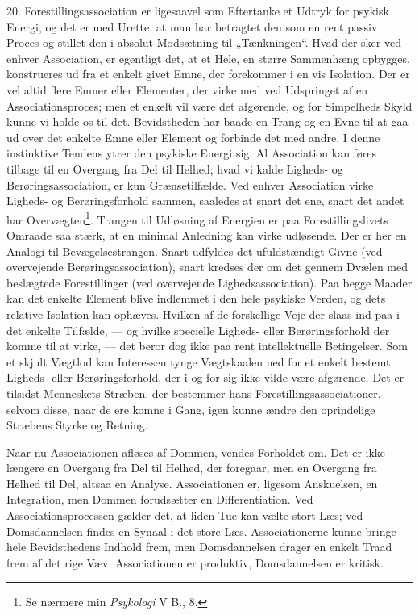 \documentclass[12pt,a4paper]{book}
\newcommand{\opage}[1]{\marginnote{\footnotesize\textit{[#1]}}}
\begin{document}
20. Forestillingsassociation er ligesaavel som Eftertanke et Udtryk for
psykisk Energi, og det er med Urette, at man har betragtet den som en
rent passiv Proces og stillet den i absolut Modsætning til
„Tænkningen“. Hvad der sker ved enhver Association, er egentligt det, at
et Hele, en større Sammenhæng opbygges, konstrueres ud fra et enkelt
givet Emne, der forekommer i en vis Isolation. Der er vel altid flere
Emner eller Elementer, der virke med ved Udspringet af en
Associationsproces; men et enkelt vil være det afgørende, og for
Simpelheds Skyld kunne vi holde os til det. Bevidstheden har baade en
Trang og en Evne til at gaa ud over det enkelte Emne eller Element og
forbinde det med andre. I denne instinktive Tendens ytrer den psykiske
Energi sig. Al Association kan føres tilbage til en Overgang fra Del til
Helhed; hvad vi kalde Ligheds- og Berøringsassociation, er kun
Grænsetilfælde. Ved enhver Association virke Ligheds- og
Berøringsforhold sammen, saaledes at snart det ene, snart det andet har
Overvægten\footnote{Se nærmere min \emph{Psykologi} V B., 8.}. Trangen
til Udløsning af Energien er paa Forestillingslivets Omraade saa stærk,
at en minimal Anledning kan virke udløsende. Der er her en Analogi til
Bevægelsestrangen. Snart udfyldes det ufuldstændigt Givne (ved
overvejende Berøringsassociation), snart kredses der om det gennem
Dvælen med beslægtede Forestillinger (ved overvejende
Lighedsassociation). Paa begge Maader kan det enkelte Element blive
indlemmet i den hele psykiske \opage{62} Verden, og dets relative Isolation kan
ophæves. Hvilken af de forskellige Veje der slaas ind paa i det enkelte
Tilfælde, --- og hvilke specielle Ligheds- eller Berøringsforhold der
komme til at virke, --- det beror dog ikke paa rent intellektuelle
Betingelser. Som et skjult Vægtlod kan Interessen tynge Vægtskaalen ned
for et enkelt bestemt Ligheds- eller Berøringsforhold, der i og for sig
ikke vilde være afgørende. Det er tilsidst Menneskets Stræben, der
bestemmer hans Forestillingsassociationer, selvom disse, naar de ere
komne i Gang, igen kunne ændre den oprindelige Stræbens Styrke og
Retning.

Naar nu Associationen afløses af Dommen, vendes Forholdet om. Det er
ikke længere en Overgang fra Del til Helhed, der foregaar, men en
Overgang fra Helhed til Del, altsaa en Analyse. Associationen er,
ligesom Anskuelsen, en Integration, men Dommen forudsætter en
Differentiation. Ved Associationsprocessen gælder det, at liden Tue kan
vælte stort Læs; ved Domsdannelsen findes en Synaal i det store Læs.
Associationerne kunne bringe hele Bevidsthedens Indhold frem, men
Domsdannelsen drager en enkelt Traad frem af det rige Væv. Associationen
er produktiv, Domsdannelsen er kritisk.
\end{document}
